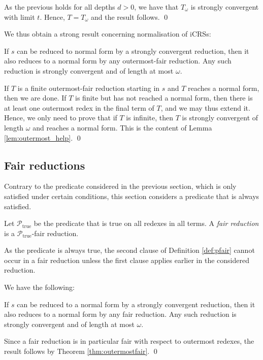 \documentclass{LMCS}
\theoremstyle{definition}
\newcommand{\Parg}[1]{\mathcal{P}_{\mathrm{#1}}\xspace}
\newcommand{\Ptrue}[0]{\Parg{true}}
\begin{document}
As the previous holds for all depths $d > 0$, we have that $T_\omega$ is strongly convergent with limit $t$. Hence, $T = T_\omega$ and the result follows.
\qed

We thus obtain a strong result concerning normalisation of iCRSs:

\begin{thm}
\label{thm:outermostfair}
If $s$ can be reduced to normal form by a strongly convergent
reduction, then it also reduces to a normal form by
any outermost-fair reduction. Any
such reduction is strongly convergent and of length at most $\omega$.
\end{thm}

\proof
If $T$ is a finite outermost-fair reduction starting in $s$
and $T$ reaches a normal form, then we are done. If $T$ is finite
but has not reached a normal form, then there is at least one
outermost redex in the final term of $T$, and we may thus extend it.
Hence, we only need to prove that if $T$ is infinite, then $T$ is
strongly convergent of length $\omega$ and reaches a normal form.
This is the content of Lemma \ref{lem:outermost_help}.
\qed

\subsection{Fair reductions}
\label{sec:fair}

Contrary to the predicate considered in the previous section, which is only satisfied under certain conditions, this section considers a predicate that is always satisfied.
\begin{defi}
Let $\Ptrue$ be the predicate that is true on all redexes in all terms.
A \emph{fair reduction} is a $\Ptrue$-fair reduction.
\end{defi}

As the predicate is always true, the second clause of Definition \ref{def:pfair} cannot occur in a fair reduction unless the first clause applies earlier in the considered reduction.

We have the following:
\begin{thm}
\label{thm:fair}
If $s$ can be reduced to a normal form by a strongly convergent reduction, then it also reduces to a normal form by any fair reduction. Any such reduction is strongly convergent and of length at most $\omega$.
\end{thm}

\proof
Since a fair reduction is in particular fair with respect to outermost redexes, the result follows by Theorem \ref{thm:outermostfair}. 
\qed
\end{document}
